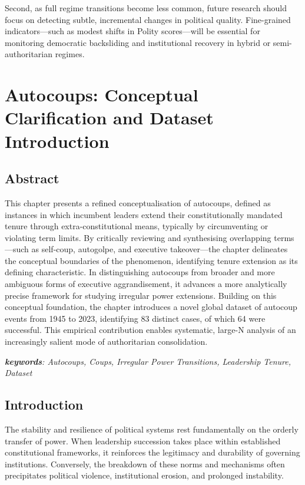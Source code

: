 \documentclass[
  12pt,
]{report}
\begin{document}
Second, as full regime transitions become less common, future research
should focus on detecting subtle, incremental changes in political
quality. Fine-grained indicators---such as modest shifts in Polity
scores---will be essential for monitoring democratic backsliding and
institutional recovery in hybrid or semi-authoritarian regimes.

\chapter{Autocoups: Conceptual Clarification and Dataset
Introduction}\label{sec-chapter3}

\section*{Abstract}\label{abstract-1}

This chapter presents a refined conceptualisation of autocoups, defined
as instances in which incumbent leaders extend their constitutionally
mandated tenure through extra-constitutional means, typically by
circumventing or violating term limits. By critically reviewing and
synthesising overlapping terms---such as self-coup, autogolpe, and
executive takeover---the chapter delineates the conceptual boundaries of
the phenomenon, identifying tenure extension as its defining
characteristic. In distinguishing autocoups from broader and more
ambiguous forms of executive aggrandisement, it advances a more
analytically precise framework for studying irregular power extensions.
Building on this conceptual foundation, the chapter introduces a novel
global dataset of autocoup events from 1945 to 2023, identifying 83
distinct cases, of which 64 were successful. This empirical contribution
enables systematic, large-N analysis of an increasingly salient mode of
authoritarian consolidation.

\emph{\textbf{keywords}: Autocoups, Coups, Irregular Power Transitions,
Leadership Tenure, Dataset}

\section{Introduction}\label{introduction-1}

The stability and resilience of political systems rest fundamentally on
the orderly transfer of power. When leadership succession takes place
within established constitutional frameworks, it reinforces the
legitimacy and durability of governing institutions. Conversely, the
breakdown of these norms and mechanisms often precipitates political
violence, institutional erosion, and prolonged instability.
\end{document}
